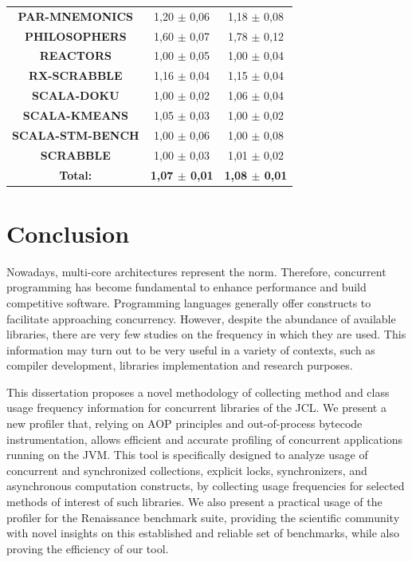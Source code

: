 \documentclass[]{usiinfthesis}
\begin{document}
\begin{table}
\begin{tabular}{|c|c|c|}
\textbf{	PAR-MNEMONICS	}&	 1,20 	 $\pm$ 	 0,06 	 & 	 1,18 	 $\pm$ 	 0,08 	\\
\textbf{	PHILOSOPHERS	}&	 1,60 	 $\pm$ 	 0,07 	 & 	 1,78 	 $\pm$ 	 0,12 	\\
\textbf{	REACTORS	}&	 1,00 	 $\pm$ 	 0,05 	 & 	 1,00 	 $\pm$ 	 0,04 	\\
\textbf{	RX-SCRABBLE	}&	 1,16 	 $\pm$ 	 0,04 	 & 	 1,15 	 $\pm$ 	 0,04 	\\
\textbf{	SCALA-DOKU	}&	 1,00 	 $\pm$ 	 0,02 	 & 	 1,06 	 $\pm$ 	 0,04 	\\
\textbf{	SCALA-KMEANS	}&	 1,05 	 $\pm$ 	 0,03 	 & 	 1,00 	 $\pm$ 	 0,02 	\\
\textbf{	SCALA-STM-BENCH	}&	 1,00 	 $\pm$ 	 0,06 	 & 	 1,00 	 $\pm$ 	 0,08 	\\
\textbf{	SCRABBLE	}&	 1,00 	 $\pm$ 	 0,03 	 & 	 1,01 	 $\pm$ 	 0,02 	\\
\hline
\textbf{	Total:	}&	  \textbf{1,07 	$\pm$		 0,01  }&\textbf{ 1,08 	$\pm$		 0,01}\\

\hline
\end{tabular}
\end{table}%



\chapter{Conclusion} \label{chap:7}

Nowadays, multi-core architectures represent the norm. Therefore, concurrent programming has become fundamental to enhance performance and build competitive software. Programming languages generally offer constructs to facilitate approaching concurrency. However, despite the abundance of available libraries, there are very few studies on the frequency in which they are used. This information may turn out to be very useful in a variety of contexts, such as compiler development, libraries implementation and research purposes.

This dissertation proposes a novel methodology of collecting method and class usage frequency information for concurrent libraries of the JCL. We present a new profiler that, relying on AOP principles and out-of-process bytecode instrumentation, allows efficient and accurate profiling of concurrent applications running on the JVM. This tool is specifically designed to analyze usage of concurrent and synchronized collections, explicit locks, synchronizers, and asynchronous computation constructs, by collecting usage frequencies for selected methods of interest of such libraries. We also present a practical usage of the profiler for the Renaissance benchmark suite, providing the scientific community with novel insights on this established and reliable set of benchmarks, while also proving the efficiency of our tool.
\end{document}

